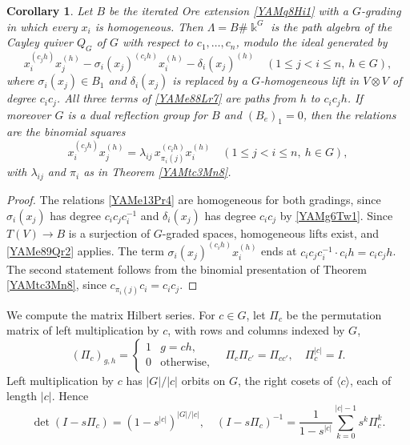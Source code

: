 \documentclass[reqno]{amsart}
\numberwithin{equation}{section}
\newtheorem{corollary}[equation]{Corollary}
\theoremstyle{definition}
\theoremstyle{remark}
\theoremstyle{plain}
\newcommand{\kk}{\Bbbk}
\begin{document}
\begin{corollary}\label{YAMc13Cq6}
Let $B$ be the iterated Ore extension \eqref{YAMq8Hi1} with a $G$-grading in which every $x_i$ is homogeneous. Then $\Lambda=B\#\kk^G$ is the path algebra of the Cayley quiver $Q_G$ of $G$ with respect to $c_1,\dots,c_n$, modulo the ideal generated by
\begin{equation}\label{YAMe88Lr7}
x_i^{(c_jh)}x_j^{(h)}-\sigma_i(x_j)^{(c_ih)}x_i^{(h)}-\delta_i(x_j)^{(h)}\quad(1\le j<i\le n,\ h\in G),
\end{equation}
where $\sigma_i(x_j)\in B_1$ and $\delta_i(x_j)$ is replaced by a $G$-homogeneous lift in $V\otimes V$ of degree $c_ic_j$. All three terms of \eqref{YAMe88Lr7} are paths from $h$ to $c_ic_jh$. If moreover $G$ is a dual reflection group for $B$ and $(B_e)_1=0$, then the relations are the binomial squares
\[
x_i^{(c_jh)}x_j^{(h)}=\lambda_{ij}\,x_{\pi_i(j)}^{(c_ih)}x_i^{(h)}\quad(1\le j<i\le n,\ h\in G),
\]
with $\lambda_{ij}$ and $\pi_i$ as in Theorem \ref{YAMtc3Mn8}.
\end{corollary}

\begin{proof}
The relations \eqref{YAMe13Pr4} are homogeneous for both gradings, since $\sigma_i(x_j)$ has degree $c_ic_jc_i^{-1}$ and $\delta_i(x_j)$ has degree $c_ic_j$ by \eqref{YAMg6Tw1}. Since $T(V)\to B$ is a surjection of $G$-graded spaces, homogeneous lifts exist, and \eqref{YAMe89Qr2} applies. The term $\sigma_i(x_j)^{(c_ih)}x_i^{(h)}$ ends at $c_ic_jc_i^{-1}\cdot c_ih=c_ic_jh$. The second statement follows from the binomial presentation of Theorem \ref{YAMtc3Mn8}, since $c_{\pi_i(j)}c_i=c_ic_j$.
\end{proof}

We compute the matrix Hilbert series. For $c\in G$, let $\Pi_c$ be the permutation matrix of left multiplication by $c$, with rows and columns indexed by $G$,
\begin{equation}\label{YAMe90Lc9}
(\Pi_c)_{g,h}=\begin{cases}1&g=ch,\\0&\text{otherwise},\end{cases}\quad\Pi_c\Pi_{c'}=\Pi_{cc'},\quad\Pi_c^{|c|}=I.
\end{equation}
Left multiplication by $c$ has $|G|/|c|$ orbits on $G$, the right cosets of $\langle c\rangle$, each of length $|c|$. Hence
\begin{equation}\label{YAMe91Dt0}
\det(I-s\Pi_c)=(1-s^{|c|})^{|G|/|c|},\quad(I-s\Pi_c)^{-1}=\frac{1}{1-s^{|c|}}\sum_{k=0}^{|c|-1}s^k\Pi_c^k.
\end{equation}
\end{document}
